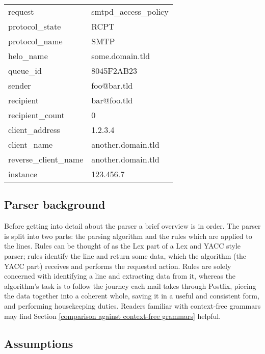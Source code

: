 \documentclass[a4paper,12pt,draft]{article}
\begin{document}
\begin{tabular}[]{ll}

    request                 & smtpd\_access\_policy     \\
    protocol\_state         & RCPT                      \\
    protocol\_name          & SMTP                      \\
    helo\_name              & some.domain.tld           \\
    queue\_id               & 8045F2AB23                \\
    sender                  & foo@bar.tld               \\
    recipient               & bar@foo.tld               \\
    recipient\_count        & 0                         \\
    client\_address         & 1.2.3.4                   \\
    client\_name            & another.domain.tld        \\
    reverse\_client\_name   & another.domain.tld        \\
    instance                & 123.456.7                 \\

\end{tabular}



\subsection{Parser background}

Before getting into detail about the parser a brief overview is in order.
The parser is split into two parts: the parsing algorithm and the rules
which are applied to the lines.  Rules can be thought of as the Lex part of
a Lex and YACC style parser; rules identify the line and return some data,
which the algorithm (the YACC part) receives and performs the requested
action.  Rules are solely concerned with identifying a line and extracting
data from it, whereas the algorithm's task is to follow the journey each
mail takes through Postfix, piecing the data together into a coherent
whole, saving it in a useful and consistent form, and performing
housekeeping duties.  Readers familiar with context-free grammars may find
Section \ref{comparison against context-free grammars} helpful.

\subsection{Assumptions}
\end{document}
